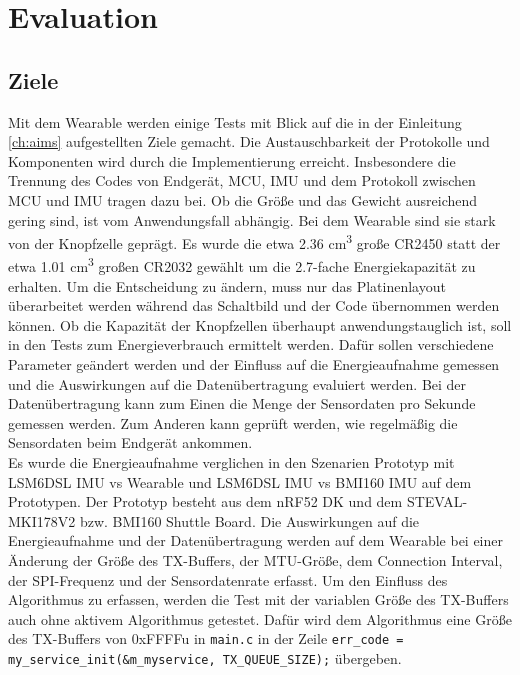 \chapter{Evaluation}
\label{ch:evaluation}

\section{Ziele}
Mit dem Wearable werden einige Tests mit Blick auf die in der Einleitung \ref{ch:aims} aufgestellten Ziele gemacht.
Die Austauschbarkeit der Protokolle und Komponenten wird durch die Implementierung erreicht.
Insbesondere die Trennung des Codes von Endgerät, MCU, IMU und dem Protokoll zwischen MCU und IMU tragen dazu bei.
Ob die Größe und das Gewicht ausreichend gering sind, ist vom Anwendungsfall abhängig.
Bei dem Wearable sind sie stark von der Knopfzelle geprägt.
Es wurde die etwa 2.36 cm\textsuperscript{3} große CR2450 statt der etwa 1.01 cm\textsuperscript{3} großen CR2032 gewählt um die 2.7-fache Energiekapazität zu erhalten.
Um die Entscheidung zu ändern, muss nur das Platinenlayout überarbeitet werden während das Schaltbild und der Code übernommen werden können.
Ob die Kapazität der Knopfzellen überhaupt anwendungstauglich ist, soll in den Tests zum Energieverbrauch ermittelt werden.
Dafür sollen verschiedene Parameter geändert werden und der Einfluss auf die Energieaufnahme gemessen und die Auswirkungen auf die Datenübertragung evaluiert werden.
Bei der Datenübertragung kann zum Einen die Menge der Sensordaten pro Sekunde gemessen werden.
Zum Anderen kann geprüft werden, wie regelmäßig die Sensordaten beim Endgerät ankommen.\\
Es wurde die Energieaufnahme verglichen in den Szenarien Prototyp mit LSM6DSL IMU vs Wearable und LSM6DSL IMU vs BMI160 IMU auf dem Prototypen.
Der Prototyp besteht aus dem nRF52 DK und dem STEVAL-MKI178V2 bzw. BMI160 Shuttle Board.
Die Auswirkungen auf die Energieaufnahme und der Datenübertragung werden auf dem Wearable bei einer Änderung der Größe des TX-Buffers, der MTU-Größe, dem Connection Interval, der SPI-Frequenz und der Sensordatenrate erfasst.
Um den Einfluss des Algorithmus zu erfassen, werden die Test mit der variablen Größe des TX-Buffers auch ohne aktivem Algorithmus getestet.
Dafür wird dem Algorithmus eine Größe des TX-Buffers von 0xFFFFu in \texttt{main.c} in der Zeile \texttt{err\_code = my\_service\_init(\allowbreak{}\&m\_myservice, TX\_QUEUE\_SIZE);} übergeben.

